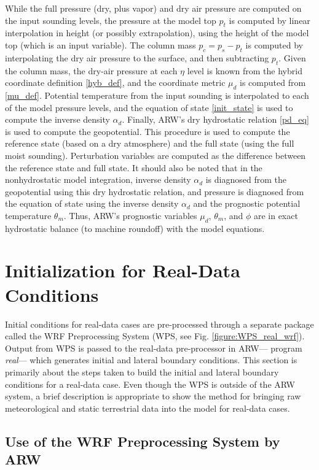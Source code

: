 While the full pressure (dry, plus vapor) and dry air pressure are
computed on the input sounding levels, the pressure at the model top $p_{t}$
is computed by linear interpolation in height (or possibly
extrapolation), using the height of the model top (which is an input variable).
The column mass $p_c=p_s-p_t$ is computed by interpolating the dry air
pressure to the surface, and then subtracting $p_{t}$.  Given the
column mass, the dry-air pressure at each $\eta$ level is known from the
hybrid coordinate definition \eqref{hyb_def}, and the coordinate metric 
$\mu_d$ is computed from \eqref{mu_def}.
Potential temperature from the input sounding is interpolated to
each of the model pressure levels, and the equation of state
\eqref{init_state} is used to compute the inverse density 
$\alpha_d$.  Finally, 
ARW's dry hydrostatic relation \eqref{pd_eq}
is used to compute the geopotential.  This procedure is used to compute
the reference state (based on a dry atmosphere) and the full state
(using the full moist sounding).  Perturbation variables are
computed as the difference between the reference state and full state.  It
should also be noted that in the nonhydrostatic model integration,
inverse density $\alpha_d$ is diagnosed from the geopotential using
this dry hydrostatic relation, and pressure is diagnosed from the equation
of state using the inverse density $\alpha_d$ and the prognostic potential
temperature $\theta_m$.  Thus, ARW's prognostic variables $\mu_d$,
$\theta_m$, and $\phi$ are in exact hydrostatic balance (to machine roundoff) 
with the model equations.

\section{Initialization for Real-Data Conditions}
Initial conditions for real-data cases are pre-processed through a separate 
package called the WRF Preprocessing System (WPS, see Fig. \ref{figure:WPS_real_wrf}).  
Output from WPS is passed to the 
real-data pre-processor in ARW--- program {\it real}--- which generates initial and lateral boundary
conditions.  This section is primarily about the steps taken to build the
initial and lateral boundary conditions for a real-data case.  Even though the
WPS is outside of the ARW system, a brief description is appropriate to show the 
method for bringing raw meteorological and static terrestrial data into the model
for real-data cases.

\subsection{Use of the WRF Preprocessing System by ARW}

